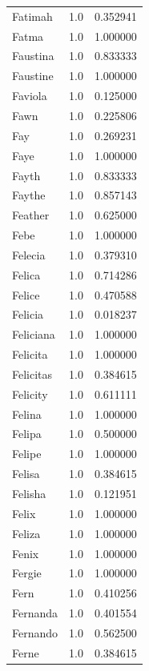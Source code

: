 \documentclass[
  letterpaper,
  DIV=11,
  numbers=noendperiod]{scrreprt}
\begin{document}
\begin{tabular}{lrr}
Fatimah         &   1.0 &   0.352941 \\
Fatma           &   1.0 &   1.000000 \\
Faustina        &   1.0 &   0.833333 \\
Faustine        &   1.0 &   1.000000 \\
Faviola         &   1.0 &   0.125000 \\
Fawn            &   1.0 &   0.225806 \\
Fay             &   1.0 &   0.269231 \\
Faye            &   1.0 &   1.000000 \\
Fayth           &   1.0 &   0.833333 \\
Faythe          &   1.0 &   0.857143 \\
Feather         &   1.0 &   0.625000 \\
Febe            &   1.0 &   1.000000 \\
Felecia         &   1.0 &   0.379310 \\
Felica          &   1.0 &   0.714286 \\
Felice          &   1.0 &   0.470588 \\
Felicia         &   1.0 &   0.018237 \\
Feliciana       &   1.0 &   1.000000 \\
Felicita        &   1.0 &   1.000000 \\
Felicitas       &   1.0 &   0.384615 \\
Felicity        &   1.0 &   0.611111 \\
Felina          &   1.0 &   1.000000 \\
Felipa          &   1.0 &   0.500000 \\
Felipe          &   1.0 &   1.000000 \\
Felisa          &   1.0 &   0.384615 \\
Felisha         &   1.0 &   0.121951 \\
Felix           &   1.0 &   1.000000 \\
Feliza          &   1.0 &   1.000000 \\
Fenix           &   1.0 &   1.000000 \\
Fergie          &   1.0 &   1.000000 \\
Fern            &   1.0 &   0.410256 \\
Fernanda        &   1.0 &   0.401554 \\
Fernando        &   1.0 &   0.562500 \\
Ferne           &   1.0 &   0.384615 \\

\end{tabular}
\end{document}
